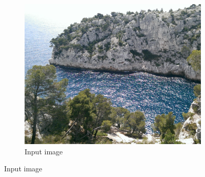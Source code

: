 \documentclass[a4paper]{article}
\begin{document}
\begin{figure}[H]
	\begin{subfigure}[h]{0.24\textwidth}
		\centering
		\includegraphics[width=\textwidth]{calanque}
		\caption*{Input image}
	\end{subfigure}
	

\end{figure}
\end{document}
